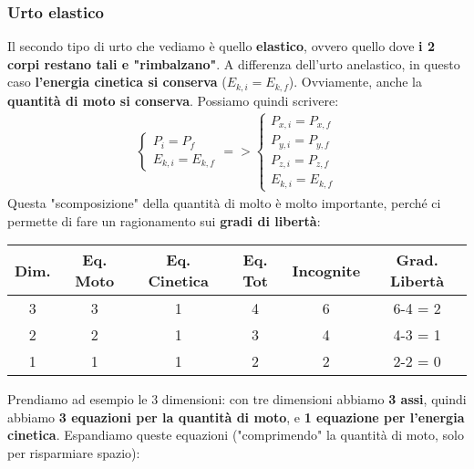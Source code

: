         \subsubsection{Urto elastico}
            Il secondo tipo di urto che vediamo è quello \textbf{elastico}, ovvero quello dove \textbf{i 2 corpi restano tali e "rimbalzano"}. A differenza dell'urto anelastico, in questo caso \textbf{l'energia cinetica si conserva} ($E_{k, i} = E_{k, f}$). Ovviamente, anche la \textbf{quantità di moto si conserva}. Possiamo quindi scrivere:
            \begin{align*}
                \begin{cases}
                    P_i=P_f\\
                    E_{k, i}=E_{k, f}
                \end{cases}=>
                \begin{cases}
                    P_{x, i}=P_{x, f}\\
                    P_{y, i}=P_{y, f}\\
                    P_{z, i}=P_{z, f}\\
                    E_{k, i}=E_{k, f}
                \end{cases}
            \end{align*}
            Questa "scomposizione" della quantità di molto è molto importante, perché ci permette di fare un ragionamento sui \textbf{gradi di libertà}:
            \begin{center}
                \begin{tabular}{||c c c c c c||}
                    \hline
                    Dim. & Eq. Moto & Eq. Cinetica & Eq. Tot & Incognite & Grad. Libertà\\ [0.5ex]
                    \hline\hline
                    3 & 3 & 1 & 4 & 6 & 6-4 = 2\\
                    \hline
                    2 & 2 & 1 & 3 & 4 & 4-3 = 1\\
                    \hline
                    1 & 1 & 1 & 2 & 2 & 2-2 = 0\\
                    \hline
                \end{tabular}
            \end{center}
            Prendiamo ad esempio le 3 dimensioni: con tre dimensioni abbiamo \textbf{3 assi}, quindi abbiamo \textbf{3 equazioni per la quantità di moto}, e \textbf{1 equazione per l'energia cinetica}. Espandiamo queste equazioni ("comprimendo" la quantità di moto, solo per risparmiare spazio):
